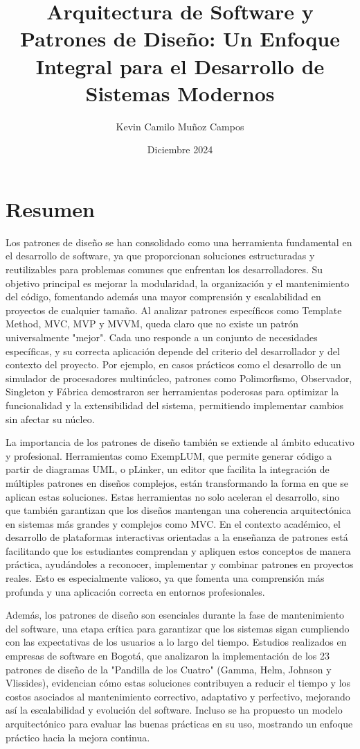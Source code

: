 \documentclass{article}
\title{Arquitectura de Software y Patrones de Diseño: Un Enfoque Integral para el Desarrollo de Sistemas Modernos}
\author{Kevin Camilo Muñoz Campos}
\date{Diciembre 2024}
\begin{document}
\maketitle

\section*{Resumen}
Los patrones de diseño se han consolidado como una herramienta fundamental en el desarrollo de software, ya que proporcionan soluciones estructuradas y reutilizables para problemas comunes que enfrentan los desarrolladores. Su objetivo principal es mejorar la modularidad, la organización y el mantenimiento del código, fomentando además una mayor comprensión y escalabilidad en proyectos de cualquier tamaño. Al analizar patrones específicos como Template Method, MVC, MVP y MVVM, queda claro que no existe un patrón universalmente "mejor". Cada uno responde a un conjunto de necesidades específicas, y su correcta aplicación depende del criterio del desarrollador y del contexto del proyecto. Por ejemplo, en casos prácticos como el desarrollo de un simulador de procesadores multinúcleo, patrones como Polimorfismo, Observador, Singleton y Fábrica demostraron ser herramientas poderosas para optimizar la funcionalidad y la extensibilidad del sistema, permitiendo implementar cambios sin afectar su núcleo.

La importancia de los patrones de diseño también se extiende al ámbito educativo y profesional. Herramientas como ExempLUM, que permite generar código a partir de diagramas UML, o pLinker, un editor que facilita la integración de múltiples patrones en diseños complejos, están transformando la forma en que se aplican estas soluciones. Estas herramientas no solo aceleran el desarrollo, sino que también garantizan que los diseños mantengan una coherencia arquitectónica en sistemas más grandes y complejos como MVC. En el contexto académico, el desarrollo de plataformas interactivas orientadas a la enseñanza de patrones está facilitando que los estudiantes comprendan y apliquen estos conceptos de manera práctica, ayudándoles a reconocer, implementar y combinar patrones en proyectos reales. Esto es especialmente valioso, ya que fomenta una comprensión más profunda y una aplicación correcta en entornos profesionales.

Además, los patrones de diseño son esenciales durante la fase de mantenimiento del software, una etapa crítica para garantizar que los sistemas sigan cumpliendo con las expectativas de los usuarios a lo largo del tiempo. Estudios realizados en empresas de software en Bogotá, que analizaron la implementación de los 23 patrones de diseño de la "Pandilla de los Cuatro" (Gamma, Helm, Johnson y Vlissides), evidencian cómo estas soluciones contribuyen a reducir el tiempo y los costos asociados al mantenimiento correctivo, adaptativo y perfectivo, mejorando así la escalabilidad y evolución del software. Incluso se ha propuesto un modelo arquitectónico para evaluar las buenas prácticas en su uso, mostrando un enfoque práctico hacia la mejora continua.
\end{document}
